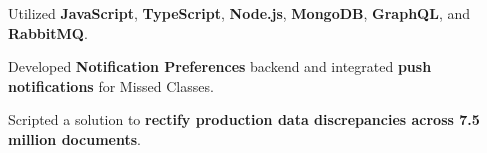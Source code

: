 \documentclass[]{deedy-resume-openfont}
\begin{document}
\begin{minipage}[t]{0.66\textwidth}

\sectionsep
\begin{tightemize}
\item Utilized \textbf{JavaScript}, \textbf{TypeScript}, \textbf{Node.js}, \textbf{MongoDB}, \textbf{GraphQL}, and \textbf{RabbitMQ}.
\item Developed \textbf{Notification Preferences} backend and integrated \textbf{push notifications} for Missed Classes.
\item Scripted a solution to \textbf{rectify production data discrepancies across 7.5 million documents}.
\end{tightemize}



\end{minipage}
\end{document}
